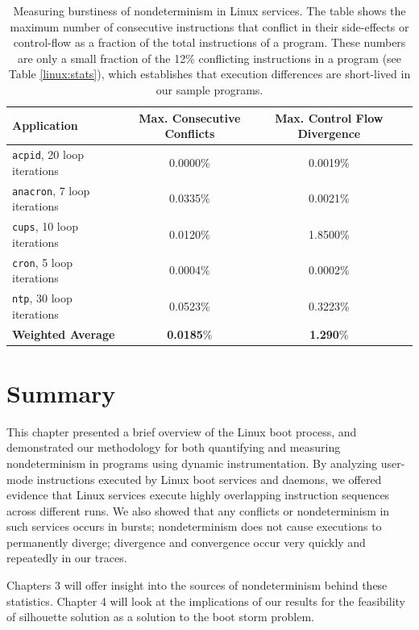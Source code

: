\begin{table}
\begin{center}
\begin{tabular}{||l|c|c|c||}\hline
  Application & Max. Consecutive Conflicts & Max. Control Flow Divergence \\
  \hline \hline
  \texttt{acpid}, 20 loop iterations & 0.0000\% & 0.0019\% 
  \\\hline
  \texttt{anacron}, 7 loop iterations & 0.0335\% & 0.0021\% 
  \\\hline 
  \texttt{cups}, 10 loop iterations & 0.0120\% & 1.8500\% 
  \\\hline 
  \texttt{cron}, 5 loop iterations & 0.0004\% & 0.0002\% 
  \\\hline 
  \texttt{ntp}, 30 loop iterations & 0.0523\% & 0.3223\% 
  \\\hline 
  \hline 
  {\bf Weighted Average} & {\bf 0.0185}\% & {\bf 1.290}\% %
  \\\hline 
\end{tabular}
\end{center}
\caption{Measuring burstiness of nondeterminism in Linux services. \newline
The table shows the maximum number of consecutive instructions that conflict
in their side-effects or control-flow as a fraction of 
the total instructions of a program. These numbers are
only a small fraction of the 12\% conflicting
instructions in a program (see Table \ref{linux:stats}),
which establishes that execution differences are short-lived in our 
sample programs.} 
\label{burst:stats}
\end{table}


\newpage \section{Summary}
This chapter presented a brief overview of the Linux boot process,
and demonstrated our methodology for both quantifying and measuring nondeterminism
in programs using dynamic instrumentation. By analyzing user-mode
instructions executed by Linux boot services and daemons, we offered
evidence that Linux services execute highly overlapping instruction
sequences across different runs. We also showed
that any conflicts or nondeterminism in such services occurs in bursts;
nondeterminism does not cause executions to permanently diverge;
divergence and convergence occur very quickly and repeatedly in our
traces.

Chapters 3 will offer insight into the sources 
of nondeterminism behind these statistics. 
Chapter 4 will look at the implications of our results 
for the feasibility of silhouette solution as a solution to the boot storm problem.

